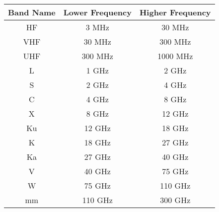\documentclass[12pt]{article}
\begin{document}
    \begin{center}
        \begin{tabular}{ |c|c|c| }
            \hline
                Band Name & Lower Frequency & Higher Frequency \\
            \hline

            \hline
                HF & 3 MHz & 30 MHz \\
                VHF & 30 MHz & 300 MHz \\
                UHF & 300 MHz & 1000 MHz \\
                L & 1 GHz & 2 GHz \\
                S & 2 GHz & 4 GHz \\
                C & 4 GHz & 8 GHz \\
                X & 8 GHz & 12 GHz \\
                Ku & 12 GHz & 18 GHz \\
                K & 18 GHz & 27 GHz \\
                Ka & 27 GHz & 40 GHz \\
                V & 40 GHz & 75 GHz \\
                W & 75 GHz & 110 GHz \\
                mm & 110 GHz & 300 GHz \\
            \hline
        \end{tabular}
    \end{center}
\end{document}
